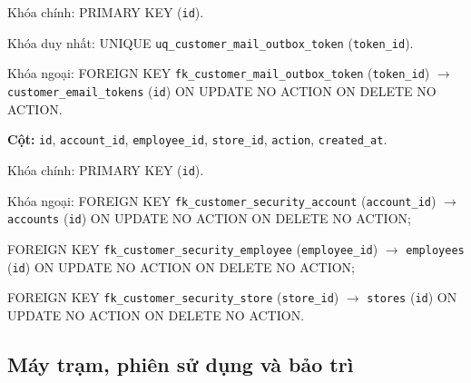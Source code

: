 \begin{description}[leftmargin=3.6cm,labelwidth=3.4cm,style=nextline]
Khóa chính: PRIMARY KEY (\texttt{id}).

Khóa duy nhất: UNIQUE \texttt{uq\_customer\_mail\_outbox\_token} (\texttt{token\_id}).

Khóa ngoại: FOREIGN KEY \texttt{fk\_customer\_mail\_outbox\_token} (\texttt{token\_id}) $\rightarrow$ \texttt{customer\_email\_tokens} (\texttt{id}) ON UPDATE NO ACTION ON DELETE NO ACTION.

\item[\texttt{customer\_security\_audit}] \textbf{Cột:} \texttt{id}, \texttt{account\_id}, \texttt{employee\_id}, \texttt{store\_id}, \texttt{action}, \texttt{created\_at}.

Khóa chính: PRIMARY KEY (\texttt{id}).

Khóa ngoại: FOREIGN KEY \texttt{fk\_customer\_security\_account} (\texttt{account\_id}) $\rightarrow$ \texttt{accounts} (\texttt{id}) ON UPDATE NO ACTION ON DELETE NO ACTION;\par FOREIGN KEY \texttt{fk\_customer\_security\_employee} (\texttt{employee\_id}) $\rightarrow$ \texttt{employees} (\texttt{id}) ON UPDATE NO ACTION ON DELETE NO ACTION;\par FOREIGN KEY \texttt{fk\_customer\_security\_store} (\texttt{store\_id}) $\rightarrow$ \texttt{stores} (\texttt{id}) ON UPDATE NO ACTION ON DELETE NO ACTION.

\end{description}

\subsection{Máy trạm, phiên sử dụng và bảo trì}


